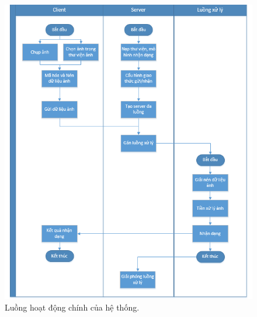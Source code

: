 \begin{figure}[H]
	\centering
	\includegraphics[width=0.88\linewidth]{images/app_sequence}
	\caption{Luồng hoạt động chính của hệ thống.}
	\label{fig:app_sequence}
\end{figure}


